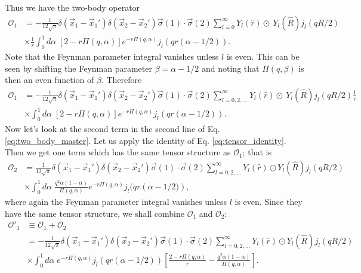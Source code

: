 \documentclass{book}[12pt]
\begin{document}
Thus we have the two-body operator
\begin{equation}
\begin{split}
\mathcal{O}_1&=-\frac{1}{12\sqrt{\pi}}\delta(\vec{x}_1-\vec{x}_1')\delta(\vec{x}_2-\vec{x}_2')\vec{\sigma}(1)\cdot\vec{\sigma}(2)\sum_{l=0}^{\infty}Y_l(\hat{r})\odot\ Y_l(\hat{R})j_l(qR/2)\\
&\times\frac{1}{r}\int_0^1d\alpha\;\left[2-r\Pi(q,\alpha)\right]e^{-r\Pi(q,\alpha)}j_l\left(qr(\alpha-1/2)\right).
\end{split}
\end{equation}
Note that the Feynman parameter integral vanishes unless $l$ is even. This can be seen by shifting the Feynman parameter $\beta=\alpha-1/2$ and noting that $\Pi(q,\beta)$ is then an even function of $\beta$. Therefore
\begin{equation}
\begin{split}
\mathcal{O}_1&=-\frac{1}{12\sqrt{\pi}}\delta(\vec{x}_1-\vec{x}_1')\delta(\vec{x}_2-\vec{x}_2')\vec{\sigma}(1)\cdot\vec{\sigma}(2)\sum_{l=0,2,...}^{\infty}Y_l(\hat{r})\odot\ Y_l(\hat{R})j_l(qR/2)\frac{1}{r}\\
&\times\int_0^1d\alpha\;\left[2-r\Pi(q,\alpha)\right]e^{-r\Pi(q,\alpha)}j_l\left(qr(\alpha-1/2)\right).
\end{split}
\end{equation}
Now let's look at the second term in the second line of Eq. \ref{eq:two_body_master}. Let us apply the identity of Eq. \ref{eq:tensor_identity}. Then we get one term which has the same tensor structure as $\mathcal{O}_1$; that is
\begin{equation}
\begin{split}
\mathcal{O}_2&=\frac{1}{12\sqrt{\pi}}\delta(\vec{x}_1-\vec{x}_1')\delta(\vec{x}_2-\vec{x}_2')\vec{\sigma}(1)\cdot\vec{\sigma}(2)\sum_{l=0,2,...}^{\infty}Y_l(\hat{r})\odot Y_l(\hat{R})j_l(qR/2)\\
&\times\int_0^1 d\alpha\;\frac{q^2\alpha(1-\alpha)}{\Pi(q,\alpha)}e^{-r\Pi(q,\alpha)}j_l(qr\left(\alpha-1/2)\right),
\end{split}
\end{equation}
where again the Feynman parameter integral vanishes unless $l$ is even. Since they have the same tensor structure, we shall combine $\mathcal{O}_1$ and $\mathcal{O}_2$:
\begin{equation}
\begin{split}
\mathcal{O}'_1&\equiv\mathcal{O}_1+\mathcal{O}_2\\
&=-\frac{1}{12\sqrt{\pi}}\delta(\vec{x}_1-\vec{x}_1')\delta(\vec{x}_2-\vec{x}_2')\vec{\sigma}(1)\cdot\vec{\sigma}(2)\sum_{l=0,2,...}^{\infty}Y_l(\hat{r})\odot Y_l(\hat{R})j_l(qR/2)\\
&\times\int_0^1d\alpha\;e^{-r\Pi(q,\alpha)}j_l(qr(\alpha-1/2))\left[\frac{2-r\Pi(q,\alpha)}{r}-\frac{q^2\alpha(1-\alpha)}{\Pi(q,\alpha)}\right].
\end{split}
\end{equation}
\end{document}
